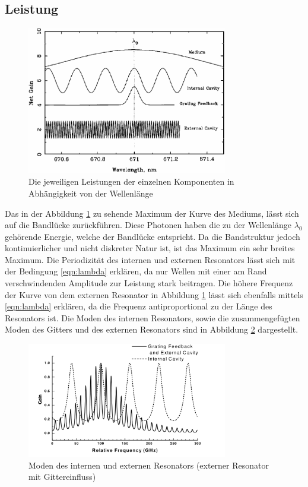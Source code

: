 \subsection{Leistung}
\begin{figure}
    \centering
    \includegraphics[width = 0.78\textwidth]{pictures/gain.png}
    \caption{Die jeweiligen Leistungen der einzelnen Komponenten in Abhängigkeit von der Wellenlänge\cite{theorie}}
    \label{pic:gain}
\end{figure}
Das in der Abbildung \ref{pic:gain} zu sehende Maximum der Kurve des Mediums, lässt sich auf die Bandlücke zurückführen. 
Diese Photonen haben die zu der Wellenlänge $\lambda_0$ gehörende Energie, welche der Bandlücke entspricht. 
Da die Bandstruktur jedoch kontinuierlicher und nicht diskreter Natur ist, ist das Maximum ein sehr breites Maximum.
Die Periodizität des internen und externen Resonators lässt sich mit der Bedingung \ref{eqn:lambda} erklären, da nur Wellen mit einer am Rand verschwindenden Amplitude zur Leistung stark beitragen.
Die höhere Frequenz der Kurve von dem externen Resonator in Abbildung \ref{pic:gain} lässt sich ebenfalls mittels \ref{eqn:lambda} erklären, da die Frequenz antiproportional zu der Länge des Resonators ist. 
Die Moden des internen Resonators, sowie die zusammengefügten Moden des Gitters und des externen Resonators sind in Abbildung \ref{pic:moden}
dargestellt. 
\begin{figure}
    \centering
    \includegraphics[width = 0.78\textwidth]{pictures/Moden.png}
    \caption{Moden des internen und externen Resonators (externer Resonator mit Gittereinfluss) \cite{theorie}}
    \label{pic:moden}
\end{figure}
